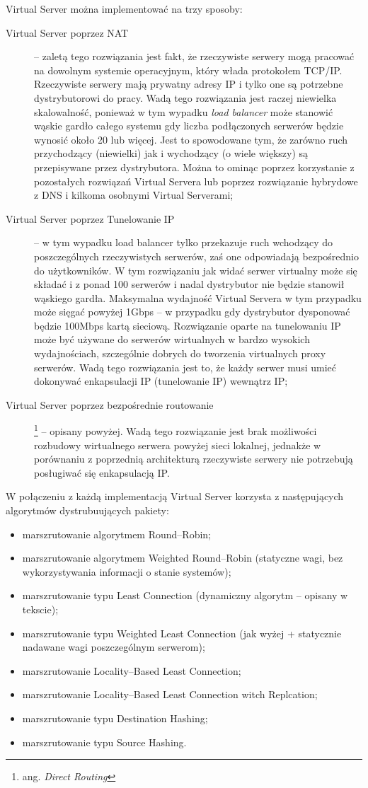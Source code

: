 Virtual Server można implementować na trzy sposoby:
\begin{description}
\item[Virtual Server poprzez NAT] -- zaletą tego rozwiązania jest fakt, że rzeczywiste serwery mogą pracować na dowolnym
systemie operacyjnym, który włada protokołem TCP/IP. Rzeczywiste serwery mają prywatny adresy IP i tylko one są potrzebne
dystrybutorowi do pracy. Wadą tego rozwiązania jest raczej niewielka skalowalność, ponieważ w tym wypadku \emph{load balancer}
może stanowić wąskie gardło całego systemu gdy liczba podłączonych serwerów będzie wynosić około 20 lub więcej. Jest to
spowodowane tym, że zarówno ruch przychodzący (niewielki) jak i wychodzący (o wiele większy) są przepisywane przez dystrybutora.
Można to ominąc poprzez korzystanie z pozostałych rozwiązań Virtual Servera lub poprzez rozwiązanie hybrydowe z DNS i kilkoma
osobnymi Virtual Serverami;
\item[Virtual Server poprzez Tunelowanie IP] -- w tym wypadku load balancer tylko przekazuje
ruch wchodzący do poszczególnych rzeczywistych serwerów, zaś one odpowiadają bezpośrednio do użytkowników. W tym rozwiązaniu 
jak widać serwer virtualny może się składać i z ponad 100 serwerów i nadal dystrybutor nie będzie stanowił wąskiego gardła.
Maksymalna wydajność Virtual Servera w tym przypadku może sięgać powyżej 1Gbps -- w przypadku gdy dystrybutor dysponować
będzie 100Mbps kartą sieciową. Rozwiązanie oparte na tunelowaniu IP może być używane do serwerów wirtualnych w bardzo 
wysokich wydajnościach, szczególnie dobrych do tworzenia virtualnych proxy serwerów. Wadą tego rozwiązania jest to, że każdy
serwer musi umieć dokonywać enkapsulacji IP (tunelowanie IP) wewnątrz IP; 
\item[Virtual Server poprzez bezpośrednie routowanie]\footnote{ang. \emph{Direct Routing}} -- opisany powyżej. Wadą tego 
rozwiązanie jest brak możliwości rozbudowy wirtualnego serwera powyżej sieci lokalnej, jednakże w porównaniu z poprzednią
architekturą rzeczywiste serwery nie potrzebują posługiwać się enkapsulacją IP.
\end{description}

W połączeniu z każdą implementacją Virtual Server korzysta z następujących algorytmów dystrubuujących pakiety:
\begin{itemize}
\item marszrutowanie algorytmem Round--Robin;
\item marszrutowanie algorytmem Weighted Round--Robin (statyczne wagi, bez wykorzystywania informacji o stanie systemów);
\item marszrutowanie typu Least Connection (dynamiczny algorytm -- opisany w tekscie);
\item marszrutowanie typu Weighted Least Connection (jak wyżej + statycznie nadawane wagi poszczególnym serwerom);
\item marszrutowanie Locality--Based Least Connection;
\item marszrutowanie Locality--Based Least Connection witch Replcation;
\item marszrutowanie typu Destination Hashing;
\item marszrutowanie typu Source Hashing.
\end{itemize}

